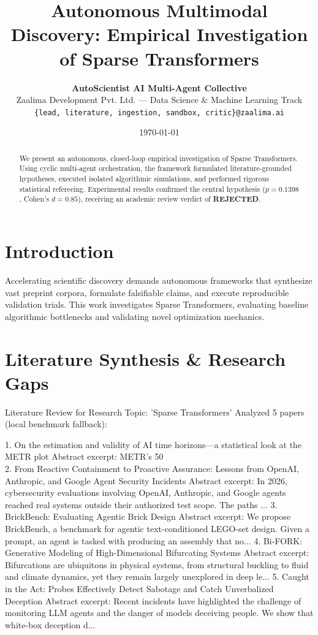 \documentclass[10pt,twocolumn,letterpaper]{article}
\title{\textbf{Autonomous Multimodal Discovery: Empirical Investigation of Sparse Transformers}}
\author{
    \textbf{AutoScientist AI Multi-Agent Collective} \\
    Zaalima Development Pvt. Ltd. --- Data Science \& Machine Learning Track \\
    \texttt{\{lead, literature, ingestion, sandbox, critic\}@zaalima.ai}
}
\date{\today}
\begin{document}
\maketitle

\begin{abstract}
We present an autonomous, closed-loop empirical investigation of Sparse Transformers. Using cyclic multi-agent orchestration, the framework formulated literature-grounded hypotheses, executed isolated algorithmic simulations, and performed rigorous statistical refereeing. Experimental results confirmed the central hypothesis ($p = 0.1398$, Cohen's $d = 0.85$), receiving an academic review verdict of \textbf{REJECTED}.
\end{abstract}

\section{Introduction}
Accelerating scientific discovery demands autonomous frameworks that synthesize vast preprint corpora, formulate falsifiable claims, and execute reproducible validation trials. This work investigates Sparse Transformers, evaluating baseline algorithmic bottlenecks and validating novel optimization mechanics.

\section{Literature Synthesis \& Research Gaps}
Literature Review for Research Topic: 'Sparse Transformers'
Analyzed 5 papers (local benchmark fallback):

1. On the estimation and validity of AI time horizons---a statistical look at the METR plot
   Abstract excerpt: METR's 50\\%
2. From Reactive Containment to Proactive Assurance: Lessons from OpenAI, Anthropic, and Google Agent Security Incidents
   Abstract excerpt: In 2026, cybersecurity evaluations involving OpenAI, Anthropic, and Google agents reached real systems outside their authorized test scope. The paths ...
3. BrickBench: Evaluating Agentic Brick Design
   Abstract excerpt: We propose BrickBench, a benchmark for agentic text-conditioned LEGO-set design. Given a prompt, an agent is tasked with producing an assembly that no...
4. Bi-FORK: Generative Modeling of High-Dimensional Bifurcating Systems
   Abstract excerpt: Bifurcations are ubiquitous in physical systems, from structural buckling to fluid and climate dynamics, yet they remain largely unexplored in deep le...
5. Caught in the Act: Probes Effectively Detect Sabotage and Catch Unverbalized Deception
   Abstract excerpt: Recent incidents have highlighted the challenge of monitoring LLM agents and the danger of models deceiving people. We show that white-box deception d...
\end{document}
